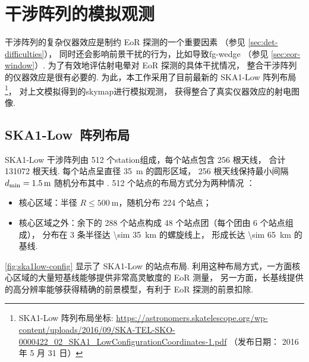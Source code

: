 \section{干涉阵列的模拟观测}
\label{sec:obs-simu}

干涉阵列的复杂仪器效应是制约 EoR 探测的一个重要因素
（参见 \autoref{sec:det-difficulties}），
同时还会影响前景干扰的行为，比如导致\ac{fg-wedge}
（参见 \autoref{sec:eor-window}）.
为了有效地评估射电晕对 EoR 探测的具体干扰情况，
整合干涉阵列的仪器效应是很有必要的.
为此，本工作采用了目前最新的 SKA1-Low 阵列布局\footnote{\raggedright%
  SKA1-Low 阵列布局坐标:
  \url{https://astronomers.skatelescope.org/wp-content/uploads/2016/09/SKA-TEL-SKO-0000422_02_SKA1_LowConfigurationCoordinates-1.pdf}
  （发布日期： 2016 年 5 月 31 日）}，
对上文模拟得到的\ac{skymap}进行模拟观测，
获得整合了真实仪器效应的射电图像.

\subsection{SKA1-Low~阵列布局}

SKA1-Low 干涉阵列由 512 个\ac{station}组成，每个站点包含 256 根天线，
合计 \num{131072} 根天线.
每个站点呈直径 \SI{35}{\meter} 的圆形区域，
256 根天线保持最小间隔 $d_{\mathrm{min}} = \SI{1.5}{\meter}$
随机分布其中 \cite{mort2017}.
512 个站点的布局方式分为两种情况 \cite{dewdney2016ska}：
\begin{itemize}
  \item 核心区域：半径 $R \le \SI{500}{\meter}$，随机分布 224 个站点；
  \item 核心区域之外：余下的 288 个站点构成 48 个站点团（每个团由 6 个站点组成），
    分布在 3 条半径达 \SI{\sim 35}{\km} 的螺旋线上，
    形成长达 \SI{\sim 65}{\km} 的基线.
\end{itemize}
\autoref{fig:ska1low-config} 显示了 SKA1-Low 的站点布局.
利用这种布局方式，一方面核心区域的大量短基线能够提供非常高灵敏度的 EoR 测量，
另一方面，长基线提供的高分辨率能够获得精确的前景模型，有利于 EoR 探测的前景扣除.

